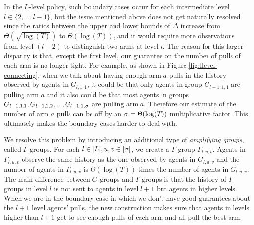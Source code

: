 
In the $L$-level policy, such boundary cases occur for each
intermediate level $l\in \{2, \ldots, l-1\}$, but the issue mentioned
above does not get naturally resolved since the ratios between the
upper and lower bounds of $\Delta$ increase from $\Theta\left(\sqrt{\log(T)}\right)$
to $\Theta(\log(T))$, and it would require more observations from
level $(l-2)$ to distinguish two arms at level $l$. The reason for
this larger disparity is that, except the first level, our guarantee on 
the number of pulls of each arm is no longer tight. For example,
as shown in Figure \ref{fig:llevel-connecting}, when we talk about
having enough arm $a$ pulls in the history observed by agents in
$G_{l,1,1}$, it could be that only agents in group $G_{l-1,1,1}$ are
pulling arm $a$ and it also could be that most agents in groups
$G_{l-1,1,1},G_{l-1,1,2},...,G_{l-1,1,\sigma}$ are pulling arm
$a$. Therefore our estimate of the number of arm $a$ pulls can be off
by an $\sigma=\Theta(\log(T))$ multiplicative factor. This ultimately
makes the boundary cases harder to deal with.

We resolve this problem by introducing an additional type of \emph{amplifying groups}, called $\Gamma$-groups. For each $l \in [L], u,v \in [\sigma]$, we create a $\Gamma$-group $\Gamma_{l,u,v}$. Agents in $\Gamma_{l,u,v}$ observe the same history as the one observed by agents in $G_{l,u,v}$ and the number of agents in $\Gamma_{l,u,v}$ is $\Theta(\log(T))$ times the number of agents in $G_{l,u,v}$. The main difference between $G$-groups and $\Gamma$-groups is that the history of $\Gamma$-groups in level $l$ is not sent to agents in level $l+1$ but agents in higher levels. When we are in the boundary case in which we don't have good guarantees about the $l+1$ level agents' pulls, the new construction makes sure that agents in levels higher than $l+1$ get to see enough pulls of each arm and all pull the best arm. 
